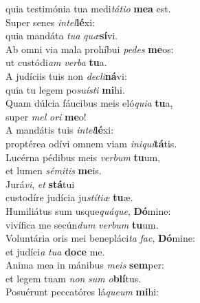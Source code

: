 \oddverse quia testimónia tua medi\textit{tá}\textit{ti}\textit{o} \textbf{me}\textbf{a} est.\\
\evenverse Super senes \textit{in}\textit{tel}\textbf{lé}xi:~\*\\
\evenverse quia mandáta \textit{tu}\textit{a} \textit{quæ}\textbf{sí}vi.\\
\oddverse Ab omni via mala prohíbui \textit{pe}\textit{des} \textbf{me}os:~\*\\
\oddverse ut custódi\textit{am} \textit{ver}\textit{ba} \textbf{tu}a.\\
\evenverse A judíciis tuis non \textit{de}\textit{cli}\textbf{ná}vi:~\*\\
\evenverse quia tu legem po\textit{su}\textit{í}\textit{sti} \textbf{mi}hi.\\
\oddverse Quam dúlcia fáucibus meis eló\textit{qui}\textit{a} \textbf{tu}a,~\*\\
\oddverse super \textit{mel} \textit{o}\textit{ri} \textbf{me}o!\\
\evenverse A mandátis tuis \textit{in}\textit{tel}\textbf{lé}xi:~\*\\
\evenverse proptérea odívi omnem viam \textit{i}\textit{ni}\textit{qui}\textbf{tá}tis.\\
\oddverse Lucérna pédibus meis \textit{ver}\textit{bum} \textbf{tu}um,~\*\\
\oddverse et lumen \textit{sé}\textit{mi}\textit{tis} \textbf{me}is.\\
\evenverse Jurá\textit{vi}, \textit{et} \textbf{stá}tui~\*\\
\evenverse custodíre judícia ju\textit{stí}\textit{ti}\textit{æ} \textbf{tu}æ.\\
\oddverse Humiliátus sum usque\textit{quá}\textit{que}, \textbf{Dó}mine:~\*\\
\oddverse vivífica me secún\textit{dum} \textit{ver}\textit{bum} \textbf{tu}um.\\
\evenverse Voluntária oris mei benepláci\textit{ta} \textit{fac}, \textbf{Dó}mine:~\*\\
\evenverse et judíci\textit{a} \textit{tu}\textit{a} \textbf{do}\textbf{ce} me.\\
\oddverse Anima mea in mánibus \textit{me}\textit{is} \textbf{sem}per:~\*\\
\oddverse et legem tuam \textit{non} \textit{sum} \textit{o}\textbf{blí}tus.\\
\evenverse Posuérunt peccatóres lá\textit{que}\textit{um} \textbf{mi}hi:~\*\\
